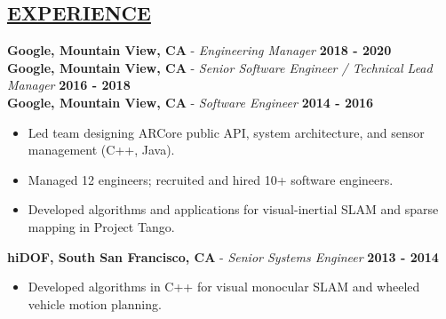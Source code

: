 \documentclass[line,margin]{res}
\newenvironment{compactlist}{
	\begin{itemize}\itemsep=0pt
}{
	\end{itemize}
}
\begin{document}

\address{164 Granada Dr, Mountain View, CA 94043}
\address{650.762.6844 $\mid$ adamleeper@gmail.com}
\address{github.com/aleeper}
\address{linkedin.com/in/adam-leeper}
\address{www.adamleeper.com}



\begin{resume}
%
\section{\underline{EXPERIENCE}}
\vspace{1.0pc}
{\bf Google, Mountain View, CA} - \emph{Engineering Manager}
  \hfill \textbf{2018 - 2020}
  \\[0.0pc]
{\bf Google, Mountain View, CA} - \emph{Senior Software Engineer / Technical Lead Manager}
  \hfill \textbf{2016 - 2018}
\\[0.0pc]
{\bf Google, Mountain View, CA} - \emph{Software Engineer}
  \hfill \textbf{2014 - 2016}
  \begin{compactlist}
    \item Led team designing ARCore public API,
      system architecture, and sensor management (C++, Java).
    \item Managed 12 engineers; recruited and hired 10+ software engineers.
    \item Developed algorithms and applications for
      visual-inertial SLAM and sparse mapping in Project Tango.
  \end{compactlist}
{\bf hiDOF, South San Francisco, CA} - \emph{Senior Systems Engineer}
  \hfill \textbf{2013 - 2014}
  \begin{compactlist}
    \item Developed algorithms in C++ for visual monocular SLAM and wheeled vehicle motion planning.

\end{compactlist}
\end{resume}
\end{document}
